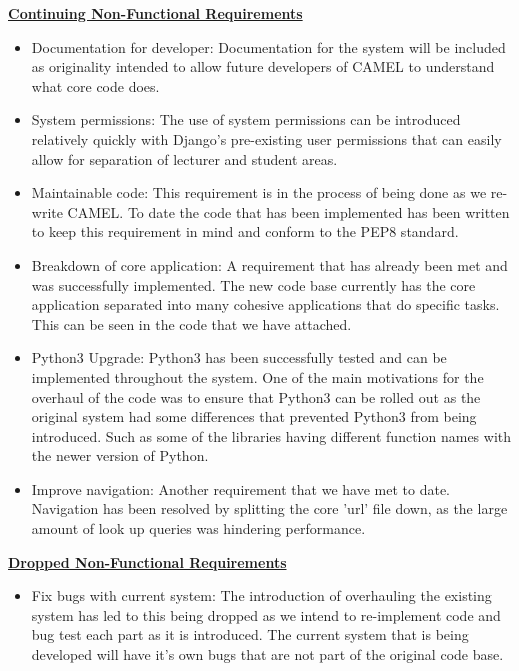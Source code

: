 	\underline{\textbf{Continuing Non-Functional Requirements}}
	\begin{itemize}
		
		\item Documentation for developer: Documentation for the system will be included as originality intended to allow future developers of CAMEL to understand what core code does.  
		
		\item System permissions: The use of system permissions can be introduced relatively quickly with Django's pre-existing user permissions that can easily allow for separation of lecturer and student areas.    
		
		\item Maintainable code: This requirement is in the process of being done as we re-write CAMEL. To date the code that has been implemented has been written to keep this requirement in mind and conform to the PEP8 standard.
		
		\item Breakdown of core application: A requirement that has already been met and was successfully implemented. The new code base currently has the core application separated into many cohesive applications that do specific tasks. This can be seen in the code that we have attached.
		
		\item Python3 Upgrade: Python3 has been successfully tested and can be implemented throughout the system. One of the main motivations for the overhaul of the code was to ensure that Python3 can be rolled out as the original system had some differences that prevented Python3 from being introduced. Such as some of the libraries having different function names with the newer version of Python.    
		
		\item Improve navigation: Another requirement that we have met to date. Navigation has been resolved by splitting the core 'url' file down, as the large amount of look up queries was hindering performance.
	\end{itemize}
	
	\underline{\textbf{Dropped Non-Functional Requirements}}
	\begin{itemize}
		\item Fix bugs with current system: The introduction of overhauling the existing system has led to this being dropped as we intend to re-implement code and bug test each part as it is introduced. The current system that is being developed will have it's own bugs that are not part of the original code base.   
	\end{itemize}
	